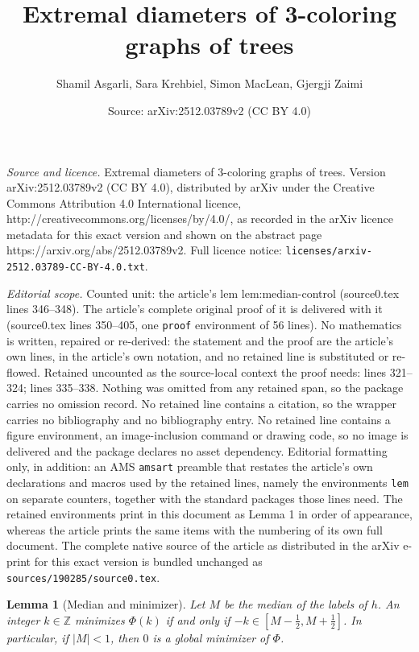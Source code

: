 \documentclass[10pt,a4paper]{amsart}
\title{Extremal diameters of 3-coloring graphs of trees}
\author{Shamil Asgarli, Sara Krehbiel, Simon MacLean, Gjergji Zaimi}
\date{Source: arXiv:2512.03789v2 (CC BY 4.0)}
\newtheorem{lem}{Lemma}
\newcommand{\Z}{\mathbb{Z}}
\begin{document}
\maketitle

\noindent\emph{Source and licence.} Extremal diameters of 3-coloring graphs of trees. Version arXiv:2512.03789v2 (CC BY 4.0), distributed by arXiv under the Creative Commons Attribution 4.0 International licence, http://creativecommons.org/licenses/by/4.0/, as recorded in the arXiv licence metadata for this exact version and shown on the abstract page https://arxiv.org/abs/2512.03789v2. Full licence notice: \texttt{licenses/arxiv-2512.03789-CC-BY-4.0.txt}.\par\smallskip

\noindent\textit{Editorial scope.} Counted unit: the article's lem lem:median-control (source0.tex lines 346--348). The article's complete original proof of it is delivered with it (source0.tex lines 350--405, one \texttt{proof} environment of 56 lines). No mathematics is written, repaired or re-derived: the statement and the proof are the article's own lines, in the article's own notation, and no retained line is substituted or re-flowed.  Retained uncounted as the source-local context the proof needs: lines 321--324; lines 335--338.  Nothing was omitted from any retained span, so the package carries no omission record.  No retained line contains a citation, so the wrapper carries no bibliography and no bibliography entry.  No retained line contains a figure environment, an image-inclusion command or drawing code, so no image is delivered and the package declares no asset dependency.  Editorial formatting only, in addition: an AMS \texttt{amsart} preamble that restates the article's own declarations and macros used by the retained lines, namely the environments \texttt{lem} on separate counters, together with the standard packages those lines need.  The retained environments print in this document as Lemma 1 in order of appearance, whereas the article prints the same items with the numbering of its own full document.  The complete native source of the article as distributed in the arXiv e-print for this exact version is bundled unchanged as \texttt{sources/190285/source0.tex}.
\begin{lem}[Median and minimizer]
\label{lem:minimizer}
Let $M$ be the median of the labels of $h$. An integer $k \in \Z$ minimizes $\Phi(k)$ if and only if $-k\in [M-\frac{1}{2}, M+\frac{1}{2}]$. In particular, if $|M| < 1$, then $0$ is a global minimizer of $\Phi$.
\end{lem}
\end{document}

